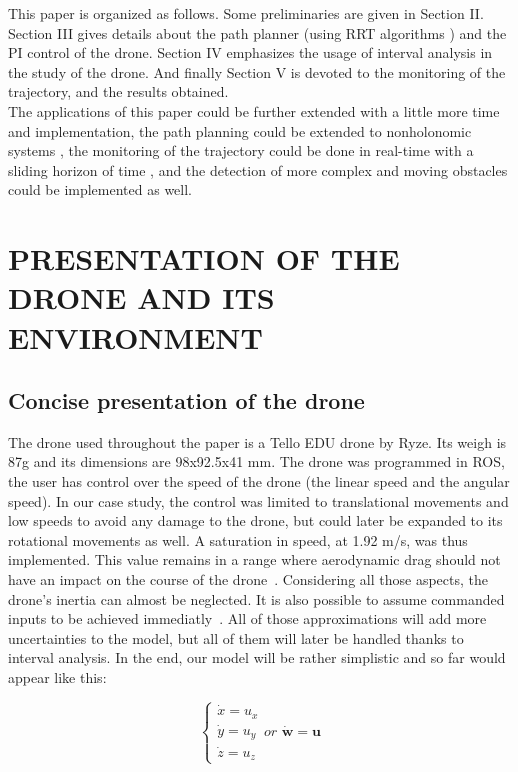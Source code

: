 \documentclass[letterpaper, 10 pt, conference]{ieeeconf}  %
\begin{document}
This paper is organized as follows. Some preliminaries are given in Section II. Section III gives details about the path planner (using RRT algorithms \cite{RRT,3D_RRT}) and the PI control of the drone. Section IV emphasizes the usage of interval analysis in the study of the drone. And finally Section V is devoted to the monitoring of the trajectory, and the results obtained.\\
The applications of this paper could be further extended with a little more time and implementation, the path planning could be extended to nonholonomic systems \cite{3D_RRT}, the monitoring of the trajectory could be done in real-time with a sliding horizon of time \cite{Sliding}, and the detection of more complex and moving obstacles could be implemented as well.

\section{PRESENTATION OF THE DRONE AND ITS ENVIRONMENT}

\subsection{Concise presentation of the drone}

The drone used throughout the paper is a Tello EDU drone by Ryze. Its weigh is 87g and its dimensions are 98x92.5x41 mm. The drone was programmed in ROS, the user has control over the speed of the drone (the linear speed and the angular speed). In our case study, the control was limited to translational movements and low speeds to avoid any damage to the drone, but could later be expanded to  its rotational movements as well. A saturation in speed, at 1.92 m/s, was thus implemented. This value remains in a range where aerodynamic drag should not have an impact on the course of the drone~\cite{Safe}. Considering all those aspects, the drone's inertia can almost be neglected. It is also possible to assume commanded inputs to be achieved immediatly~\cite{Safe}. All of those approximations will add more uncertainties to the model, but all of them will later be handled thanks to interval analysis. 
In the end, our model will be rather simplistic and so far would appear like this:

\begin{equation}
    \left\{
    \begin{array}{ll}
        \dot{x} = u_{x} \\
        \dot{y} = u_{y} \\
        \dot{z} = u_{z}
    \end{array}
    \textit{or } \dot{\textbf{w}} = \textbf{u}
    \right.
\end{equation}
\end{document}
